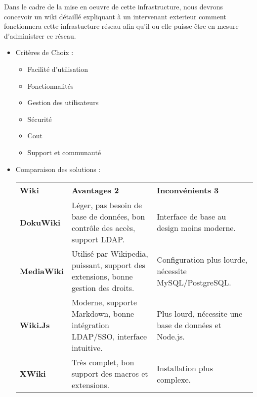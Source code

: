 \documentclass[../Livrable1.tex]{subfiles}
\begin{document}
	

Dans le cadre de la mise en oeuvre de cette infrastructure, nous devrons concevoir un wiki détaillé expliquant à un
intervenant exterieur comment fonctionnera cette infrastucture réseau afin qu'il ou elle puisse être en mesure d'administrer ce réseau.

\begin{itemize}
    \item Critères de Choix :
    \begin{multicols}{2}
    \begin{itemize}
    	\item Facilité d'utilisation
    	\item Fonctionnalités
    	\item Gestion des utilisateurs
    	\item Sécurité
    	\item Cout
    	\item Support et communauté
    \end{itemize}
	\end{multicols}

    \item Comparaison des solutions :
    	
    	\renewcommand{\arraystretch}{1.5}
    	\begin{tabularx}{\textwidth}{|X|X|X|}
    		\hline
    		Wiki & Avantages 2 & Inconvénients 3 \\ 
    		\hline
    		\textbf{DokuWiki} & Léger, pas besoin de base de données,  bon contrôle des accès, support LDAP. & Interface de base au design moins moderne. \\
    		\hline
    		\textbf{MediaWiki} & Utilisé par Wikipedia, puissant, support des extensions, bonne gestion des droits. & Configuration plus lourde, nécessite MySQL/PostgreSQL. \\
    		\hline
    		\textbf{Wiki.Js} & Moderne, supporte Markdown, bonne intégration LDAP/SSO, interface intuitive. & Plus lourd, nécessite une base de données et Node.js. \\
    		\hline
    		\textbf{XWiki} & Très complet, bon support des macros et extensions. & Installation plus complexe. \\
    		\hline
    \end{tabularx}
\end{itemize}
\end{document}
